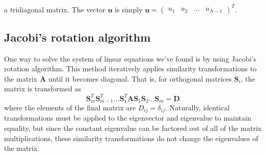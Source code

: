 \documentclass[aps,prc,reprint,nobalancelastpage]{revtex4-1}
\begin{document}
    a tridiagonal matrix. The vector $\mathbf{u}$ is simply $\mathbf{u} = \begin{pmatrix}u_1 & u_2 & \dots & u_{N-1}\end{pmatrix}^T$.

    \subsection{Jacobi's rotation algorithm}
    \label{sub:jacobi}
        One way to solve the system of linear equations we've found is by using Jacobi's rotation algorithm. This method iteratively applies similarity transformations to the matrix $\mathbf{A}$ until it becomes diagonal. That is, for orthogonal matrices $\mathbf{S}_i$, the matrix is transformed as
        \begin{equation*}
            \mathbf{S}_m^T \mathbf{S}_{m-1}^T \dots \mathbf{S}_{1}^T \mathbf{A} \mathbf{S}_{1} \mathbf{S}_{2} \dots \mathbf{S}_{m} = \mathbf{D}
        \end{equation*}
        where the elements of the final matrix are $D_{ij} = \delta_{ij}$. Naturally, identical transformations must be applied to the eigenvector and eigenvalue to maintain equality, but since the constant eigenvalue can be factored out of all of the matrix multiplications, these similarity transformations do not change the eigenvalues of the matrix.
\end{document}
